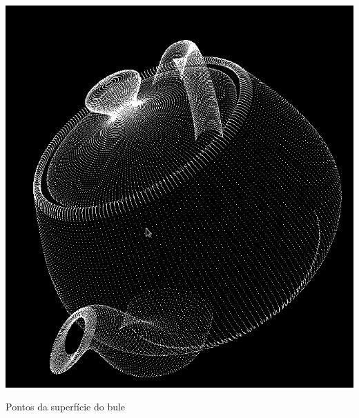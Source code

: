 \begin{center}	
 	\includegraphics[width=\textwidth,height=\textheight,keepaspectratio]{resources/teapotPontos}
 	\captionsetup{type=figure, width=0.8\linewidth}
	\caption{Pontos da superfície do bule}
\label{fig:teapotpoints} 
\end{center}



